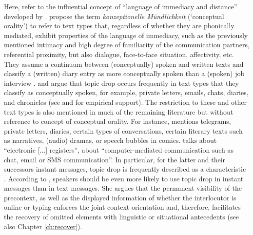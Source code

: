 \largerpage[-2]
Here, \citet{volodina.onea2012} refer to the influential concept of ``language of immediacy and distance'' developed by \citet{koch.oesterreicher1985}.
\citet[23]{koch.oesterreicher1985} propose the term \textit{konzeptionelle Mündlichkeit} (`conceptual orality') to refer to text types that, regardless of whether they are phonically mediated, exhibit properties of the language of immediacy, such as the previously mentioned intimacy and high degree of familiarity of the communication partners, referential proximity, but also dialogue, face-to-face situation, affectivity, etc.
They assume a continuum between (conceptually) spoken and written texts and classify a (written) diary entry as more conceptually spoken than a (spoken) job interview \citep[18]{koch.oesterreicher1985}.
\citet[272]{volodina2011} and \citet[221]{volodina.onea2012} argue that topic drop occurs frequently in text types that they classify as conceptually spoken, for example, private letters, emails, chats, diaries, and chronicles (see \cite{ruppenhofer2018} and  for empirical support).
The restriction to these and other text types is also mentioned in much of the remaining literature but without reference to  concept of conceptual orality. 
For instance, \citet[27]{fries1988} mentions telegrams, private letters, diaries, certain types of conversations, certain literary texts such as narratives, (audio) dramas, or speech bubbles in comics.
\citet[188]{trutkowski2016} talks about ``electronic [...] registers'', \citet[153, footnote 6]{imo2014} about ``computer-mediated communication such as chat, email or SMS communication''.
In particular, for the latter and their successors instant messages, topic drop is frequently described as a characteristic \citep{androutsopoulos.schmidt2002,doring2002,dittmann.etal2007,frick2017}. 
According to \citet[236]{frick2017}, speakers should be even more likely to use topic drop in instant messages than in text messages.
She argues that the permanent visibility of the precontext, as well as the displayed information of whether the interlocutor is online or typing enforces the joint context orientation and, therefore, facilitates the recovery  of omitted elements with linguistic or situational antecedents (see also Chapter \ref{ch:recover}).


